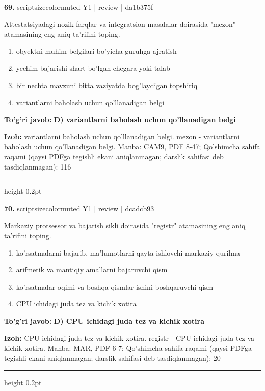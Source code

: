 \documentclass[10pt,a4paper]{article}
\begin{document}
{\bfseries\sffamily\color{ink} 69.} {scriptsizecolor{muted} Y1 | review | da1b375f}
\par
Attestatsiyadagi nozik farqlar va integratsion masalalar doirasida "mezon" atamasining eng aniq ta'rifini toping.
\begin{enumerate}[label=\Alph*),leftmargin=9mm]
\item obyektni muhim belgilari bo'yicha guruhga ajratish
\item yechim bajarishi shart bo'lgan chegara yoki talab
\item bir nechta mavzuni bitta vaziyatda bog'laydigan topshiriq
\item variantlarni baholash uchun qo'llanadigan belgi
\end{enumerate}
\begin{tcolorbox}[enhanced,breakable,colback=teal!4,colframe=teal!60!black,boxrule=0.45pt,arc=1.2mm,left=2.7mm,right=2.7mm,top=1.8mm,bottom=1.8mm,before skip=2mm,after skip=2mm]
{\bfseries\sffamily\color{teal}To'g'ri javob:} \textbf{D) variantlarni baholash uchun qo'llanadigan belgi}
\par\smallskip
{\bfseries Izoh:} variantlarni baholash uchun qo'llanadigan belgi. mezon - variantlarni baholash uchun qo'llanadigan belgi. Manba: CAM9, PDF 8-47; Qo'shimcha sahifa raqami (qaysi PDFga tegishli ekani aniqlanmagan; darslik sahifasi deb tasdiqlanmagan): 116
\end{tcolorbox}
\vspace{2mm}\hrule height 0.2pt\vspace{3mm}

{\bfseries\sffamily\color{ink} 70.} {scriptsizecolor{muted} Y1 | review | dcadcb93}
\par
Markaziy protsessor va bajarish sikli doirasida "registr" atamasining eng aniq ta'rifini toping.
\begin{enumerate}[label=\Alph*),leftmargin=9mm]
\item ko'rsatmalarni bajarib, ma'lumotlarni qayta ishlovchi markaziy qurilma
\item arifmetik va mantiqiy amallarni bajaruvchi qism
\item ko'rsatmalar oqimi va boshqa qismlar ishini boshqaruvchi qism
\item CPU ichidagi juda tez va kichik xotira
\end{enumerate}
\begin{tcolorbox}[enhanced,breakable,colback=teal!4,colframe=teal!60!black,boxrule=0.45pt,arc=1.2mm,left=2.7mm,right=2.7mm,top=1.8mm,bottom=1.8mm,before skip=2mm,after skip=2mm]
{\bfseries\sffamily\color{teal}To'g'ri javob:} \textbf{D) CPU ichidagi juda tez va kichik xotira}
\par\smallskip
{\bfseries Izoh:} CPU ichidagi juda tez va kichik xotira. registr - CPU ichidagi juda tez va kichik xotira. Manba: MAR, PDF 6-7; Qo'shimcha sahifa raqami (qaysi PDFga tegishli ekani aniqlanmagan; darslik sahifasi deb tasdiqlanmagan): 20
\end{tcolorbox}
\vspace{2mm}\hrule height 0.2pt\vspace{3mm}
\end{document}
